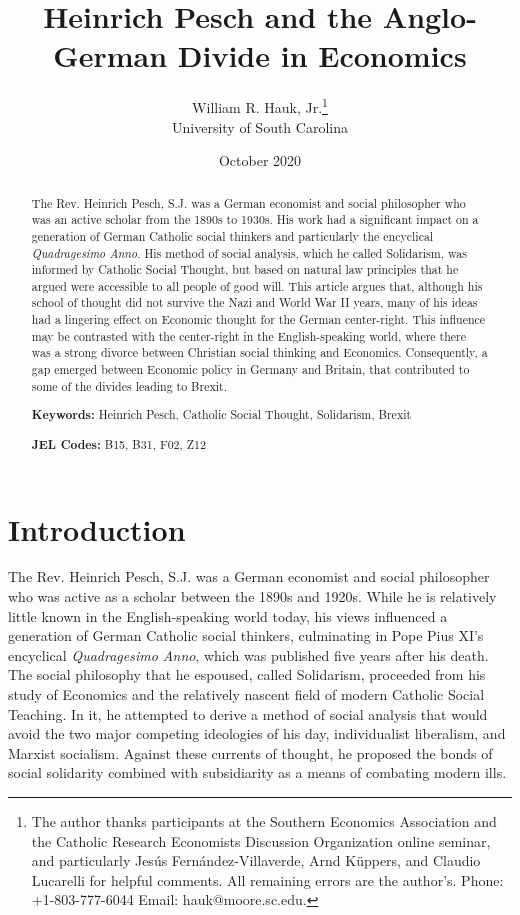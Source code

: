 \documentclass{article}
\title{Heinrich Pesch and the Anglo-German Divide in Economics}
\author{William R. Hauk, Jr.\thanks{The author thanks participants at the Southern Economics Association and the Catholic Research Economists Discussion Organization online seminar, and particularly Jes\'{u}s Fern\'{a}ndez-Villaverde, Arnd K\"{u}ppers, and Claudio Lucarelli for helpful comments.  All remaining errors are the author's.  Phone:  +1-803-777-6044  Email:  hauk@moore.sc.edu.}\\University of South Carolina}
\date{October 2020}
\begin{document}
\maketitle

\doublespacing
\begin{abstract}
The Rev. Heinrich Pesch, S.J. was a German economist and social philosopher who was an active scholar from the 1890s to 1930s.  His work had a significant impact on a generation of German Catholic social thinkers and particularly the encyclical \emph{Quadragesimo Anno}.  His method of social analysis, which he called Solidarism, was informed by Catholic Social Thought, but based on natural law principles that he argued were accessible to all people of good will.  This article argues that, although his school of thought did not survive the Nazi and World War II years, many of his ideas had a lingering effect on Economic thought for the German center-right.  This influence may be contrasted with the center-right in the English-speaking world, where there was a strong divorce between Christian social thinking and Economics.  Consequently, a gap emerged between Economic policy in Germany and Britain, that contributed to some of the divides leading to Brexit.

\textbf{Keywords:}  Heinrich Pesch, Catholic Social Thought, Solidarism, Brexit

\textbf{JEL Codes:}  B15, B31, F02, Z12

\end{abstract}

\section{Introduction}

The Rev. Heinrich Pesch, S.J. was a German economist and social philosopher who was active as a scholar between the 1890s and 1920s.  While he is relatively little known in the English-speaking world today, his views influenced a generation of German Catholic social thinkers, culminating in Pope Pius XI’s encyclical \emph{Quadragesimo Anno}, which was published five years after his death.  The social philosophy that he espoused, called Solidarism, proceeded from his study of Economics and the relatively nascent field of modern Catholic Social Teaching.  In it, he attempted to derive a method of social analysis that would avoid the two major competing ideologies of his day, individualist liberalism, and Marxist socialism.  Against these currents of thought, he proposed the bonds of social solidarity combined with subsidiarity as a means of combating modern ills.\medskip
\end{document}
